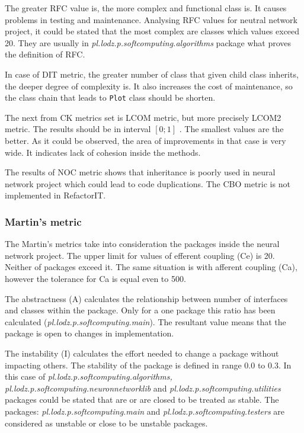 The greater \ac{RFC} value is, the more complex and functional class is. It causes problems in testing and maintenance. Analysing \ac{RFC} values for neutral network project, it could be stated that the most complex are classes which values exceed 20. They are usually in \textit{pl.lodz.p.softcomputing.algorithms} package what proves the definition of \ac{RFC}.       

In case of \ac{DIT} metric, the greater number of class that given child class inherits, the deeper degree of complexity is. It also increases the cost of maintenance, so the class chain that leads to \texttt{Plot} class should be shorten. 

The next from \ac{CK metrics} set is \ac{LCOM} metric, but more precisely LCOM2 metric. The results should be in interval $[0;1]$ . The smallest values are the better. As it could be observed, the area of improvements in that case is very wide. It indicates lack of cohesion inside the methods.  

The results of \ac{NOC} metric shows that inheritance is poorly used in neural network project which could lead to code duplications. The \ac{CBO} metric is not implemented in RefactorIT.

\subsubsection*{Martin's metric}
The Martin's metrics take into consideration the packages inside the neural network project. The upper limit for values of efferent coupling (\ac{Ce}) is 20. Neither of packages exceed it. The same situation is with afferent coupling (\ac{Ca}), however the tolerance for \ac{Ca} is equal even to 500. 

The abstractness (\ac{A}) calculates the relationship between number of interfaces and classes within the package. Only for a one package this ratio has been calculated (\textit{pl.lodz.p.soft\-com\-pu\-ting.main}). The resultant value means that the package is open to changes in implementation.

The instability (\ac{I}) calculates the effort needed to change a package without impacting others. The stability of the package is defined in range 0.0 to 0.3. In this case of \textit{pl.lodz.p.soft\-com\-pu\-ting.al\-go\-rithms, pl.lodz.p.soft\-com\-pu\-ting.neu\-ron\-net\-work\-lib} and \textit{pl.\-lodz.\-p.\-soft\-com\-pu\-ting.u\-ti\-li\-ties} packages could be stated that are or are closed to be treated as stable. The packages: \textit{pl.lodz.p.soft\-com\-pu\-ting.main} and \textit{pl.lodz.p.soft\-com\-pu\-ting.tes\-ters} are considered as unstable or close to be unstable packages.

